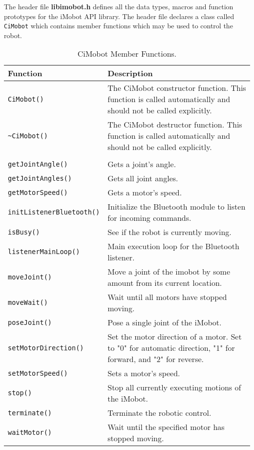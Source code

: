 \noindent
The header file {\bf libimobot.h} defines all the data types, macros 
and function prototypes for the iMobot API library. The header file
declares a class called \texttt{CiMobot} which contains member functions which
may be used to control the robot.

\begin{table}[!hp]
\capstart
\begin{center}
\caption{CiMobot Member Functions.}
\begin{tabular}{p{58 mm}p{97 mm}}
\hline
Function & Description \\
\hline
\texttt{CiMobot()} \dotfill & The CiMobot constructor function. This function
is called automatically and should not be called explicitly. \\
\texttt{\textasciitilde CiMobot()} \dotfill & The CiMobot destructor function. This function
is called automatically and should not be called explicitly. \\
& \\
\texttt{getJointAngle()} \dotfill & Gets a joint's angle. \\
\texttt{getJointAngles()} \dotfill & Gets all joint angles. \\
\texttt{getMotorSpeed()} \dotfill & Gets a motor's speed. \\
\texttt{initListenerBluetooth()} \dotfill & Initialize the Bluetooth module to
listen for incoming commands. \\
\texttt{isBusy()} \dotfill & See if the robot is currently moving. \\
\texttt{listenerMainLoop()} \dotfill & Main execution loop for the Bluetooth listener. \\
\texttt{moveJoint()} \dotfill & Move a joint of the imobot by some amount from its current location. \\
\texttt{moveWait()} \dotfill & Wait until all motors have stopped moving. \\
\texttt{poseJoint()} \dotfill & Pose a single joint of the iMobot. \\
\texttt{setMotorDirection()} \dotfill & Set the motor direction of a motor. Set
to "0" for automatic direction, "1" for forward, and "2" for reverse. \\
\texttt{setMotorSpeed()} \dotfill & Sets a motor's speed. \\
\texttt{stop()} \dotfill & Stop all currently executing motions of the iMobot. \\
\texttt{terminate()} \dotfill & Terminate the robotic control. \\
\texttt{waitMotor()} \dotfill & Wait until the specified motor has stopped moving. \\
\hline
\end{tabular}
\end{center}
\label{mobilec_api_cbinary}
\end{table}


